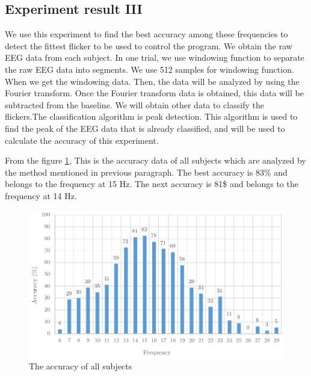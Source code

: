 \newpage
\subsection{Experiment result III}
\hspace{1.5cm} We use this experiment to find the best accuracy among these frequencies to detect the fittest flicker to be used to control the program. We obtain the raw EEG data from each subject. In one trial, we use windowing function to separate the raw EEG data into segments. We use 512 samples for windowing function. When we get the windowing data. Then, the data will be analyzed by using the Fourier transform. Once the Fourier transform data is obtained, this data will be subtracted from the baseline. We will obtain other data to classify the flickers.The classification algorithm is peak detection. This algorithm is used to find the peak of the EEG data that is already classified, and will be used to calculate the accuracy of this experiment.

From the figure \ref{fig:avg_exp3}, This is the accuracy data of all subjects which are analyzed by the method mentioned in previous paragraph. The best accuracy is 83\% and belongs to the frequency at 15 Hz. The next accuracy is 81\$ and belongs to the frequency at 14 Hz. 

\begin{figure}[ht]
	\centering
	\includegraphics[scale = 1]{chapter7/exp4.pdf}
	\caption{The accuracy of all subjects}
    \label{fig:avg_exp3}
\end{figure}

